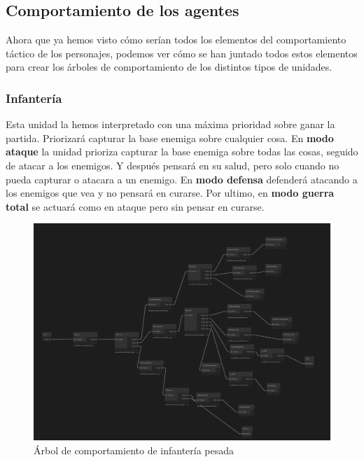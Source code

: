 \subsection{Comportamiento de los agentes}
Ahora que ya hemos visto cómo serían todos los elementos del comportamiento táctico de los personajes, podemos ver cómo se han juntado todos estos elementos para crear los árboles de comportamiento de los distintos tipos de unidades.
\subsubsection{Infantería}
Esta unidad la hemos interpretado con una máxima prioridad sobre ganar la partida. Priorizará capturar la base enemiga sobre cualquier cosa. En \textbf{modo ataque} la unidad prioriza capturar la base enemiga sobre todas las cosas, seguido de atacar a los enemigos. Y después pensará en su salud, pero solo cuando no pueda capturar o atacara a un enemigo. En\textbf{ modo defensa} defenderá atacando a los enemigos que vea y no pensará en curarse. Por ultimo, en \textbf{modo guerra total} se actuará como en ataque pero sin pensar en curarse.
\begin{figure}[H]
    \centering
    \includegraphics[scale=0.4]{doc/images/ArbolInfanteria.png}
    \caption{Árbol de comportamiento de infantería pesada}
    \label{fig:infantery}
\end{figure}

